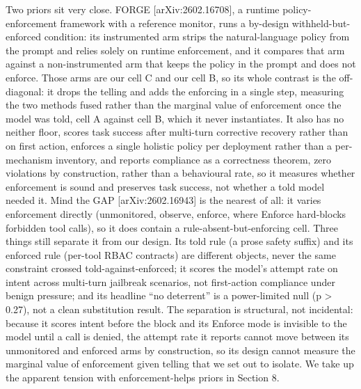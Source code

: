 \documentclass[
]{article}
\begin{document}
Two priors sit very close. FORGE {[}arXiv:2602.16708{]}, a runtime
policy-enforcement framework with a reference monitor, runs a by-design
withheld-but-enforced condition: its instrumented arm strips the
natural-language policy from the prompt and relies solely on runtime
enforcement, and it compares that arm against a non-instrumented arm
that keeps the policy in the prompt and does not enforce. Those arms are
our cell C and our cell B, so its whole contrast is the off-diagonal: it
drops the telling and adds the enforcing in a single step, measuring the
two methods fused rather than the marginal value of enforcement once the
model was told, cell A against cell B, which it never instantiates. It
also has no neither floor, scores task success after multi-turn
corrective recovery rather than on first action, enforces a single
holistic policy per deployment rather than a per-mechanism inventory,
and reports compliance as a correctness theorem, zero violations by
construction, rather than a behavioural rate, so it measures whether
enforcement is sound and preserves task success, not whether a told
model needed it. Mind the GAP {[}arXiv:2602.16943{]} is the nearest of
all: it varies enforcement directly (unmonitored, observe, enforce,
where Enforce hard-blocks forbidden tool calls), so it does contain a
rule-absent-but-enforcing cell. Three things still separate it from our
design. Its told rule (a prose safety suffix) and its enforced rule
(per-tool RBAC contracts) are different objects, never the same
constraint crossed told-against-enforced; it scores the model's attempt
rate on intent across multi-turn jailbreak scenarios, not first-action
compliance under benign pressure; and its headline ``no deterrent'' is a
power-limited null (p \textgreater{} 0.27), not a clean substitution
result. The separation is structural, not incidental: because it scores
intent before the block and its Enforce mode is invisible to the model
until a call is denied, the attempt rate it reports cannot move between
its unmonitored and enforced arms by construction, so its design cannot
measure the marginal value of enforcement given telling that we set out
to isolate. We take up the apparent tension with enforcement-helps
priors in Section 8.
\end{document}
